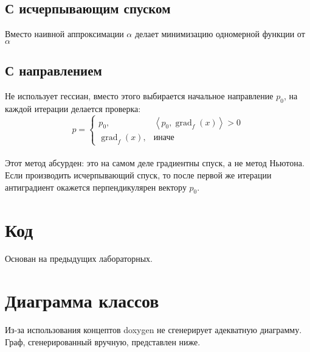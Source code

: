 \documentclass[russian, english]{article}
\newcommand{\mydot}[2]{\left\langle#1,#2\right\rangle}
\begin{document}
\subsection{С исчерпывающим спуском}
Вместо наивной аппроксимации $\alpha$ делает минимизацию одномерной функции от $\alpha$
\subsection{С направлением}
Не использует гессиан, вместо этого выбирается начальное направление $p_0$, на каждой итерации делается проверка:\\
$$
p = \begin{cases}
	p_0, & \mydot{p_0}{\operatorname{grad}_f(x)} > 0\\
	\operatorname{grad}_f(x), & \text{иначе}
\end{cases}
$$\\
Этот метод абсурден: это на самом деле градиентны спуск, а не метод Ньютона. Если производить исчерпывающий спуск, то после первой же итерации антиградиент окажется перпендикулярен вектору $p_0$.

\newpage
\appendix
\section{Код}
Основан на предыдущих лабораторных.

\section{Диаграмма классов}
Из-за использования концептов doxygen не сгенерирует адекватную диаграмму. Граф, сгенерированный вручную, представлен ниже. \\
\noindent{}
%
\end{document}
